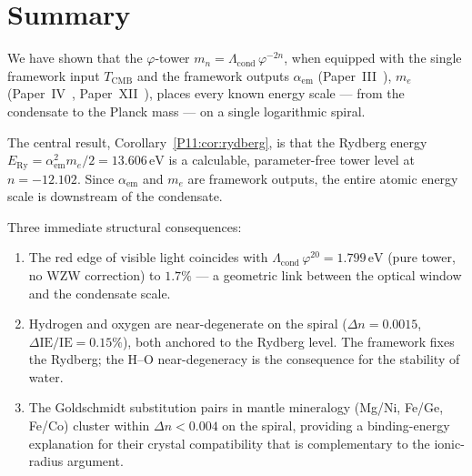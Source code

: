 \documentclass[11pt,a4paper]{article}
\theoremstyle{definition}
\theoremstyle{remark}
\newcommand{\vp}{\varphi}
\newcommand{\TCMB}{T_{\mathrm{CMB}}}
\newcommand{\Lcond}{\Lambda_{\mathrm{cond}}}
\newcommand{\ERy}{E_{\mathrm{Ry}}}
\newcommand{\aem}{\alpha_{\mathrm{em}}}
\newcommand{\IE}{\mathrm{IE}}
\begin{document}
\section{Summary}
\label{P11:sec:summary}

We have shown that the $\vp$-tower $m_n = \Lcond\,\vp^{-2n}$,
when equipped with the single framework input $\TCMB$
and the framework outputs $\aem$ (Paper~III~\cite{Paper3}), $m_e$
(Paper~IV~\cite{Paper4}, Paper~XII~\cite{Paper12}), places every known energy scale
--- from the condensate to the Planck mass ---
on a single logarithmic spiral.

The central result, Corollary~\ref{P11:cor:rydberg}, is that the
Rydberg energy $\ERy = \aem^2 m_e/2 = 13.606\,\mathrm{eV}$
is a calculable, parameter-free tower level at $n = -12.102$.
Since $\aem$ and $m_e$ are framework outputs, the entire
atomic energy scale is downstream of the condensate.

Three immediate structural consequences:
\begin{enumerate}[noitemsep]
\item The red edge of visible light coincides with
  $\Lcond\,\vp^{20} = 1.799\,\mathrm{eV}$ (pure tower,
  no WZW correction) to $1.7\%$ --- a geometric link between
  the optical window and the condensate scale.
\item Hydrogen and oxygen are near-degenerate on the spiral
  ($\Delta n = 0.0015$, $\Delta\IE/\IE = 0.15\%$),
  both anchored to the Rydberg level.
  The framework fixes the Rydberg; the H--O near-degeneracy
  is the consequence for the stability of water.
\item The Goldschmidt substitution pairs in mantle mineralogy
  (Mg/Ni, Fe/Ge, Fe/Co) cluster within $\Delta n < 0.004$ on the spiral,
  providing a binding-energy explanation for their crystal
  compatibility that is complementary to the ionic-radius argument.
\end{enumerate}
\end{document}
